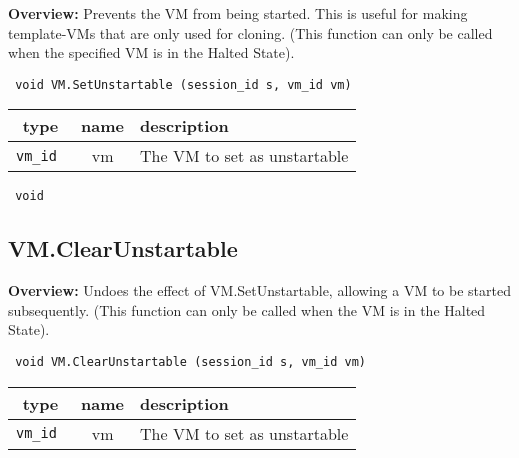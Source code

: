 {\bf Overview:} 
Prevents the VM from being started.
        This is useful for making template-VMs that are only used for cloning.
        (This function can only be called when the specified VM is in the Halted State).

\begin{verbatim} void VM.SetUnstartable (session_id s, vm_id vm)\end{verbatim}



 
\vspace{0.3cm}
\begin{tabular}{|c|c|p{7cm}|}
 \hline
{\bf type} & {\bf name} & {\bf description} \\ \hline
{\tt vm\_id } & vm & The VM to set as unstartable \\ \hline 

\end{tabular}

\vspace{0.3cm}

{\tt 
void
}



\vspace{0.3cm}
\vspace{0.3cm}
\vspace{0.3cm}

\subsection{VM.ClearUnstartable}

{\bf Overview:} 
Undoes the effect of VM.SetUnstartable, allowing a VM to be started subsequently.
        (This function can only be called when the VM is in the Halted State).

\begin{verbatim} void VM.ClearUnstartable (session_id s, vm_id vm)\end{verbatim}



 
\vspace{0.3cm}
\begin{tabular}{|c|c|p{7cm}|}
 \hline
{\bf type} & {\bf name} & {\bf description} \\ \hline
{\tt vm\_id } & vm & The VM to set as unstartable \\ \hline 

\end{tabular}

